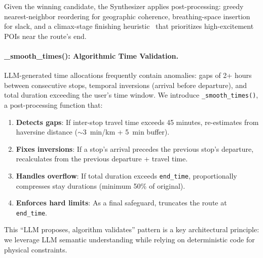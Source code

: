 \begin{table}[!t]
\centering
\caption{Synthesizer architecture comparison on 5 scenarios. Tournament (A4) was selected as production mode.}
\label{tab:synthesizer_ablation}
\end{table}

Given the winning candidate, the Synthesizer applies post-processing: greedy nearest-neighbor reordering for geographic coherence, breathing-space insertion for slack, and a climax-stage finishing heuristic~\cite{kahneman1993when} that prioritizes high-excitement POIs near the route's end.

\paragraph{\_smooth\_times(): Algorithmic Time Validation.}

LLM-generated time allocations frequently contain anomalies: gaps of 2+ hours between consecutive stops, temporal inversions (arrival before departure), and total duration exceeding the user's time window. We introduce \texttt{\_smooth\_times()}, a post-processing function that:

\begin{enumerate}[leftmargin=*]
    \item \textbf{Detects gaps}: If inter-stop travel time exceeds 45 minutes, re-estimates from haversine distance ($\sim$3~min/km + 5~min buffer).
    \item \textbf{Fixes inversions}: If a stop's arrival precedes the previous stop's departure, recalculates from the previous departure + travel time.
    \item \textbf{Handles overflow}: If total duration exceeds \texttt{end\_time}, proportionally compresses stay durations (minimum 50\% of original).
    \item \textbf{Enforces hard limits}: As a final safeguard, truncates the route at \texttt{end\_time}.
\end{enumerate}

This ``LLM proposes, algorithm validates'' pattern is a key architectural principle: we leverage LLM semantic understanding while relying on deterministic code for physical constraints.
